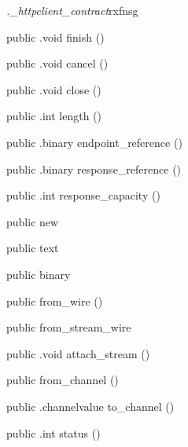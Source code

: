 \begin{CrexxClass}{\textit{.\_httpclient\_contract}}{rxfnsg}
\begin{Members}
    \Method
      {public}
      {.void}
      {finish}
      {()}

    \Method
      {public}
      {.void}
      {cancel}
      {()}

    \Method
      {public}
      {.void}
      {close}
      {()}

    \Method
      {public}
      {.int}
      {length}
      {()}

    \Method
      {public}
      {.binary}
      {endpoint\_reference}
      {()}

    \Method
      {public}
      {.binary}
      {response\_reference}
      {()}

    \Method
      {public}
      {.int}
      {response\_capacity}
      {()}

    \Factory
      {public}
      {new}
      {}

    \Factory
      {public}
      {text}
      {}

    \Factory
      {public}
      {binary}
      {}

    \Factory
      {public}
      {from\_wire}
      {()}

    \Factory
      {public}
      {from\_stream\_wire}
      {}

    \Method
      {public}
      {.void}
      {attach\_stream}
      {()}

    \Factory
      {public}
      {from\_channel}
      {()}

    \Method
      {public}
      {.channelvalue}
      {to\_channel}
      {()}

    \Method
      {public}
      {.int}
      {status}
      {()}


\end{Members}
\end{CrexxClass}
